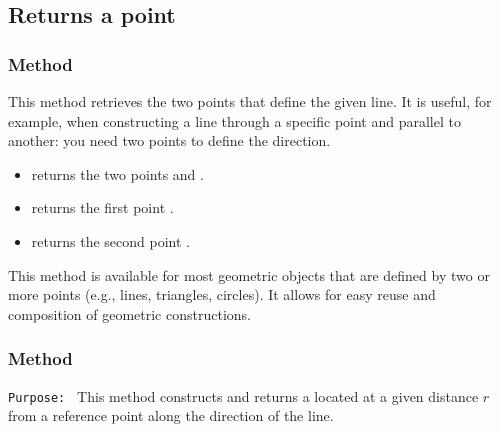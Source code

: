\subsection{Returns a point}


\subsubsection{Method }
\label{ssub:method_line_get}

This method retrieves the two points that define the given line. It is useful, for example, when constructing a line through a specific point and parallel to another: you need two points to define the direction.

\begin{itemize}
  \item {} returns the two points  and .
  \item {} returns the first point .
  \item {} returns the second point .
\end{itemize}

This method is available for most geometric objects that are defined by two or more points (e.g., lines, triangles, circles). It allows for easy reuse and composition of geometric constructions.


\begin{tkzexample}[latex=.35\textwidth]

\end{tkzexample}


\subsubsection{Method } %
\label{ssub:method_report}

\texttt{Purpose: } This method constructs and returns a  located at a given distance \( r \) from a reference point along the direction of the line.

\medskip

